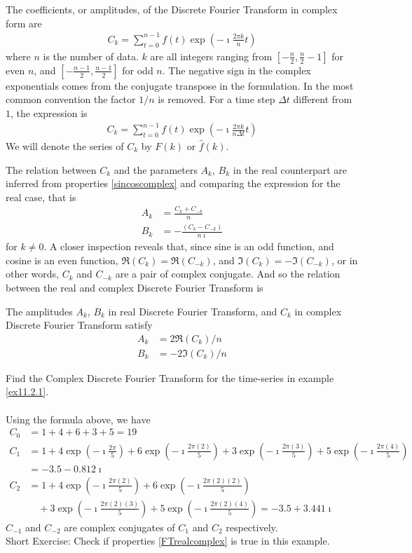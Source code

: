 \begin{defn}
The coefficients, or amplitudes, of the Discrete Fourier Transform in complex form are
\begin{align*}
C_k = \sum_{t=0}^{n-1} f(t)\exp(-\imath\frac{2\pi k}{n}t)
\end{align*}
where $n$ is the number of data. $k$ are all integers ranging from $[-\frac{n}{2}, \frac{n}{2}-1]$ for even $n$, and $[-\frac{n-1}{2}, \frac{n-1}{2}]$ for odd $n$. The negative sign in the complex exponentials comes from the conjugate transpose in the formulation. In the most common convention the factor $1/n$ is removed. For a time step $\Delta t$ different from $1$, the expression is
\begin{align*}
C_k = \sum_{t=0}^{n-1} f(t)\exp(-\imath\frac{2\pi k}{n\Delta t}t)
\end{align*}
We will denote the series of $C_k$ by $F(k)$ or $\hat{f}(k)$.
\end{defn}
The relation between $C_k$ and the parameters $A_k$, $B_k$ in the real counterpart are inferred from properties \ref{sincoscomplex} and comparing the expression for the real case, that is
\begin{align*}
A_k &= \frac{C_k + C_{-k}}{n} \\
B_k &= -\frac{(C_k - C_{-k})}{n\imath}
\end{align*}
for $k \neq 0$. A closer inspection reveals that, since sine is an odd function, and cosine is an even function, $\Re(C_k) = \Re(C_{-k})$, and $\Im(C_k) = -\Im(C_{-k})$, or in other words, $C_k$ and $C_{-k}$ are a pair of complex conjugate. And so the relation between the real and complex Discrete Fourier Transform is
\begin{proper}
\label{FTrealcomplex}
The amplitudes $A_k$, $B_k$ in real Discrete Fourier Transform, and $C_k$ in complex Discrete Fourier Transform satisfy
\begin{align*}
A_k &= 2\Re(C_k)/n \\
B_k &= -2\Im(C_k)/n
\end{align*}
\end{proper}

\begin{exmp}
Find the Complex Discrete Fourier Transform for the time-series in example \ref{ex11.2.1}.\\
\\
Using the formula above, we have
\begin{align*}
C_0 &= 1+4+6+3+5 = 19 \\
C_1 &= 1 + 4\exp(-\imath\frac{2\pi}{5}) + 6\exp(-\imath\frac{2\pi(2)}{5}) + 3\exp(-\imath\frac{2\pi(3)}{5}) + 5\exp(-\imath\frac{2\pi(4)}{5}) \\
&= -3.5 - 0.812\imath \\
C_2 &= 1 + 4\exp(-\imath\frac{2\pi(2)}{5}) + 6\exp(-\imath\frac{2\pi(2)(2)}{5}) \\
&\quad+ 3\exp(-\imath\frac{2\pi(2)(3)}{5}) + 5\exp(-\imath\frac{2\pi(2)(4)}{5}) = -3.5 + 3.441 \imath
\end{align*}
$C_{-1}$ and $C_{-2}$ are complex conjugates of $C_1$ and $C_2$ respectively. \\
Short Exercise: Check if properties \ref{FTrealcomplex} is true in this example.
\end{exmp}

